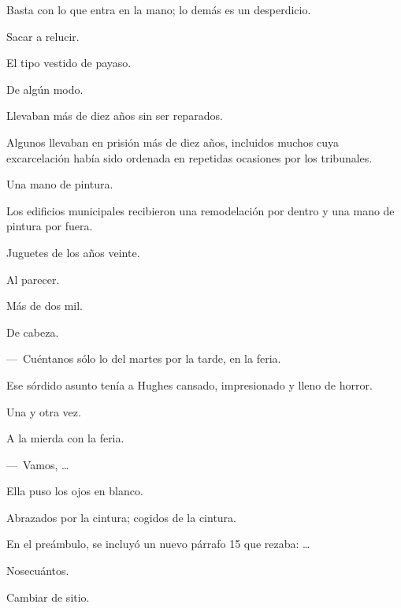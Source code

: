 \sk
Basta con lo que entra en la mano; lo demás es un desperdicio. 

\sk
Sacar a relucir. 

\sk
El tipo vestido de payaso. \nb{}

\sk
De algún modo. 

\sk
Llevaban más de diez años sin ser reparados. 

\sk
Algunos llevaban en prisión más de diez años, incluidos muchos cuya excarcelación había sido ordenada en repetidas ocasiones por los tribunales.

\sk
Una mano de pintura. 

\sk
Los edificios municipales recibieron una remodelación por dentro y una mano de pintura por fuera. \nb{}

\sk
Juguetes de los años veinte. 

\sk
Al parecer. 

\sk
Más de dos mil. 

\sk
De cabeza. 

\sk
---~Cuéntanos sólo lo del martes por la tarde, en la feria. 

\sk
Ese sórdido asunto tenía a Hughes cansado, impresionado y lleno de horror. 

\sk
Una y otra vez. 

\sk
A la mierda con la feria. 

\sk
---~Vamos, \ldots{} 

\sk
Ella puso los ojos en blanco. 

\sk
Abrazados por la cintura; cogidos de la cintura. 

\sk
En el preámbulo, se incluyó un nuevo párrafo 15 que rezaba: \ldots{} 

\sk
Nosecuántos. 

\sk
Cambiar de sitio. 

